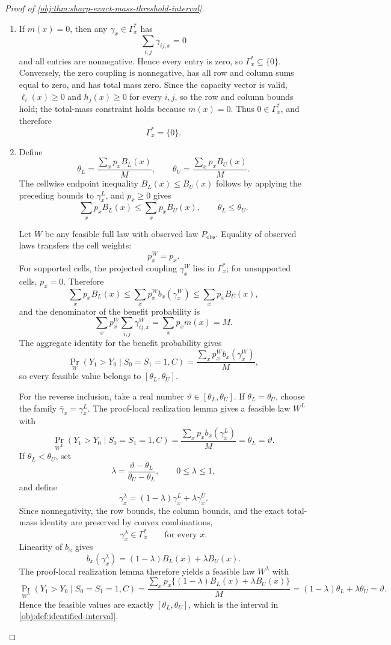 \documentclass[11pt]{article}
\begin{document}
\begin{proof}[Proof of \cref{obj:thm:sharp-exact-mass-threshold-interval}]
\begin{enumerate}
\item If \(m(x)=0\), then any \(\gamma_x\in\Gamma_x^\ast\) has
\[
\sum_{i,j}\gamma_{ij,x}=0
\]
and all entries are nonnegative.  Hence every entry is zero, so \(\Gamma_x^\ast\subseteq\{0\}\).  Conversely, the zero coupling is nonnegative, has all row and column sums equal to zero, and has total mass zero.  Since the capacity vector is valid, \(\ell_i(x)\ge0\) and \(h_j(x)\ge0\) for every \(i,j\), so the row and column bounds hold; the total-mass constraint holds because \(m(x)=0\).  Thus \(0\in\Gamma_x^\ast\), and therefore
\[
\Gamma_x^\ast=\{0\}.
\] %

\item Define
\[
\theta_L=\frac{\sum_xp_xB_L(x)}{M},
\qquad
\theta_U=\frac{\sum_xp_xB_U(x)}{M}.
\]
The cellwise endpoint inequality \(B_L(x)\le B_U(x)\) follows by applying the preceding bounds to \(\gamma_x^L\), and \(p_x\ge0\) gives
\[
\sum_xp_xB_L(x)\le \sum_xp_xB_U(x),
\qquad
\theta_L\le\theta_U .
\]

Let \(W\) be any feasible full law with observed law \(P_{\mathrm{obs}}\).  Equality of observed laws transfers the cell weights:
\[
p_x^W=p_x .
\]
For supported cells, the projected coupling \(\gamma_x^W\) lies in \(\Gamma_x^\ast\); for unsupported cells, \(p_x=0\).  Therefore
\[
\sum_xp_xB_L(x)
\le
\sum_xp_x^W b_x(\gamma_x^W)
\le
\sum_xp_xB_U(x),
\]
and the denominator of the benefit probability is
\[
\sum_xp_x^W\sum_{i,j}\gamma_{ij,x}^W
=
\sum_xp_xm(x)
=
M .
\]
The aggregate identity for the benefit probability gives
\[
\Pr_W(Y_1>Y_0\mid S_0=S_1=1,C)
=
\frac{\sum_xp_x^W b_x(\gamma_x^W)}{M},
\]
so every feasible value belongs to \([\theta_L,\theta_U]\).

For the reverse inclusion, take a real number \(\vartheta\in[\theta_L,\theta_U]\).  If \(\theta_L=\theta_U\), choose the family \(\bar\gamma_x=\gamma_x^L\).  The proof-local realization lemma gives a feasible law \(W^L\) with
\[
\Pr_{W^L}(Y_1>Y_0\mid S_0=S_1=1,C)
=
\frac{\sum_xp_xb_x(\gamma_x^L)}{M}
=
\theta_L
=
\vartheta .
\]
If \(\theta_L<\theta_U\), set
\[
\lambda=\frac{\vartheta-\theta_L}{\theta_U-\theta_L},
\qquad 0\le\lambda\le1,
\]
and define
\[
\gamma_x^\lambda=(1-\lambda)\gamma_x^L+\lambda\gamma_x^U .
\]
Since nonnegativity, the row bounds, the column bounds, and the exact total-mass identity are preserved by convex combinations,
\[
\gamma_x^\lambda\in\Gamma_x^\ast\qquad\text{for every }x.
\]
Linearity of \(b_x\) gives
\[
b_x(\gamma_x^\lambda)
=
(1-\lambda)B_L(x)+\lambda B_U(x).
\]
The proof-local realization lemma therefore yields a feasible law \(W^\lambda\) with
\[
\Pr_{W^\lambda}(Y_1>Y_0\mid S_0=S_1=1,C)
=
\frac{\sum_xp_x\{(1-\lambda)B_L(x)+\lambda B_U(x)\}}{M}
=
(1-\lambda)\theta_L+\lambda\theta_U
=
\vartheta .
\]
Hence the feasible values are exactly \([\theta_L,\theta_U]\), which is the interval in \cref{obj:def:identified-interval}. %
\end{enumerate}
\end{proof}
\end{document}
